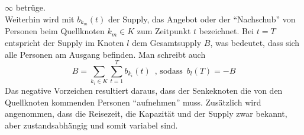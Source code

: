 \documentclass[a4paper, 11pt]{scrreprt}
\begin{document}
$\infty$ betrüge.\\
Weiterhin wird mit
$b_{k_m}(t)$ der Supply, das Angebot oder der ``Nachschub'' von Personen beim Quellknoten $k_m \in K$ zum
Zeitpunkt $t$ bezeichnet.
Bei $t = T$ entspricht der Supply im Knoten $l$ dem Gesamtsupply $B$, was bedeutet, dass sich alle Personen
am Ausgang befinden. Man schreibt auch
\begin{equation}
  B = \sum_{k_i \in K}\sum_{t=1}^{T}b_{k_i}(t)\,\,\,\text{, sodass}\,\,\, b_l(T)=-B
\end{equation}
Das negative Vorzeichen resultiert daraus, dass der Senkeknoten die von den Quellknoten kommenden Personen
``aufnehmen'' muss.
Zusätzlich wird angenommen, dass die Reisezeit, die Kapazität und der Supply zwar bekannt, aber
zustandsabhängig und somit variabel sind.
\end{document}

